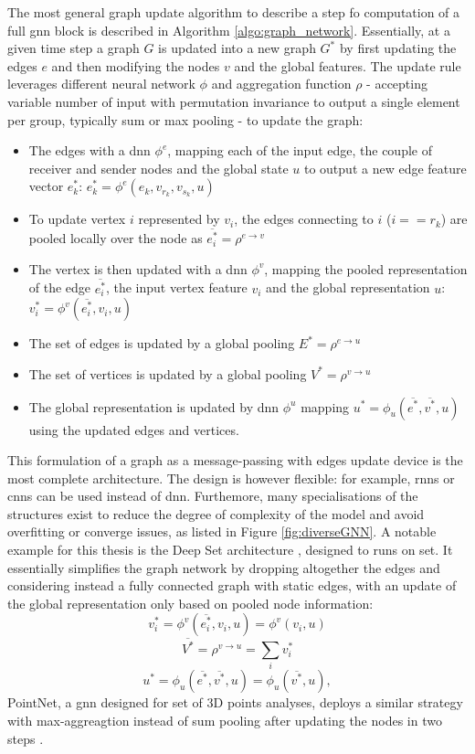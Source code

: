 The most general graph update algorithm to describe a step fo computation of a full \gls{gnn} block is described in Algorithm \ref{algo:graph_network}. Essentially, at a given time step a graph $G$ is updated into a new graph $G^*$ by first updating the edges $e$ and then modifying the nodes $v$ and the global features. The update rule leverages different neural network $\phi$ and aggregation function $\rho$ - accepting variable number of input with permutation invariance to output a single element per group, typically sum or max pooling - to update the graph: 
\begin{itemize}
    \item The edges with a \gls{dnn} $\phi^e$, mapping each of the input edge, the couple of receiver and sender nodes and the global state $u$ to output a new edge feature vector $e^*_k$: $e^*_k = \phi^e(e_k, v_{r_k}, v_{s_k}, u)$
    \item To update vertex $i$ represented by $v_i$, the edges connecting to $i$ ($i == r_k$) are pooled locally over the node as $\overline{e^*_i} = \rho^{e \rightarrow v}$
    \item The vertex is then updated with a \gls{dnn} $\phi^v$, mapping the pooled representation of the edge $\overline{e^*_i}$, the input vertex feature $v_i$ and the global representation $u$: $v^*_i = \phi^v(\overline{e^*_i}, v_i, u)$
    \item The set of edges is updated by a global pooling $E^* = \rho^{e \rightarrow u}$
    \item The set of vertices is updated by a global pooling $V^* = \rho^{v \rightarrow u}$
    \item The global representation is updated by \gls{dnn} $\phi^u$ mapping $u^* = \phi_u(\overline{e^*}, \overline{v^*}, u)$ using the updated edges and vertices. 
\end{itemize} 
This formulation of a graph as a message-passing with edges update device is the most complete architecture. The design is however flexible: for example, \gls{rnn}s or \gls{cnn}s can be used instead of \gls{dnn}. Furthemore, many specialisations of the structures exist to reduce the degree of complexity of the model and avoid overfitting or converge issues, as listed in Figure \ref{fig:diverseGNN}. A notable example for this thesis is the Deep Set architecture \cite{NIPS2017f22e4747}, designed to runs on set. It essentially simplifies the graph network by dropping altogether the edges and considering instead a fully connected graph with static edges, with an update of the global representation only based on pooled node information: 
\[v^*_i = \phi^v(\overline{e^*_i}, v_i, u) = \phi^v(v_i, u)  \] 
\[\overline{V^*} = \rho^{v \rightarrow u} = \sum_i v^*_i\] 
\[u^* = \phi_u(\overline{e^*}, \overline{v^*}, u) = \phi_u( \overline{v^*}, u), \] PointNet, a \gls{gnn} designed for set of 3D points analyses, deploys a similar strategy with max-aggreagtion instead of sum pooling after updating the nodes in two steps \cite{pointNet}.  


